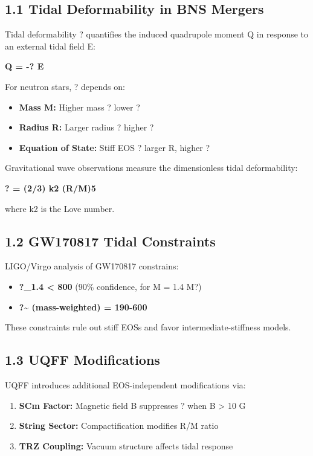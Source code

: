 \documentclass[11pt]{article}
\begin{document}
\subsection*{1.1 Tidal Deformability in BNS Mergers}

Tidal deformability ? quantifies the induced quadrupole moment Q in response to an external tidal field E:

\textbf{Q = -? E}

For neutron stars, ? depends on:

\begin{itemize}
  \item \textbf{Mass M:} Higher mass ? lower ?
  \item \textbf{Radius R:} Larger radius ? higher ?
  \item \textbf{Equation of State:} Stiff EOS ? larger R, higher ?
\end{itemize}

Gravitational wave observations measure the dimensionless tidal deformability:

\textbf{? = (2/3) k2 (R/M)5}

where k2 is the Love number.

\subsection*{1.2 GW170817 Tidal Constraints}

LIGO/Virgo analysis of GW170817 constrains:

\begin{itemize}
  \item \textbf{?\_1.4 < 800} (90\% confidence, for M = 1.4 M?)
  \item \textbf{?\textasciitilde{} (mass-weighted) = 190-600}
\end{itemize}

These constraints rule out stiff EOSs and favor intermediate-stiffness models.

\subsection*{1.3 UQFF Modifications}

UQFF introduces additional EOS-independent modifications via:

\begin{enumerate}
  \item \textbf{SCm Factor:} Magnetic field B suppresses ? when B > 10 G
  \item \textbf{String Sector:} Compactification modifies R/M ratio
  \item \textbf{TRZ Coupling:} Vacuum structure affects tidal response
\end{enumerate}
\end{document}
